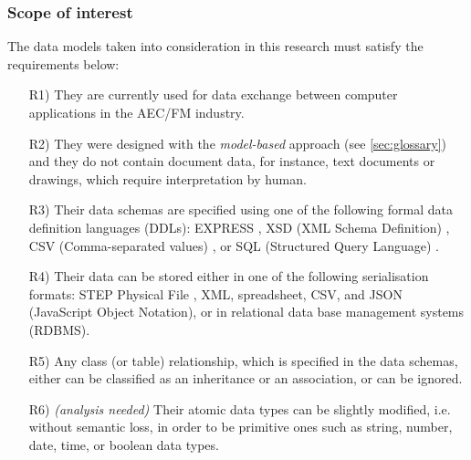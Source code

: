 \subsubsection{Scope of interest}\label{sec:scope-of-interest}

The data models taken into consideration in this research must satisfy the requirements below:

\begin{enumerate}

    \item[R1)]\label{req:R1} They are currently used for data exchange between computer applications in the AEC/FM industry.

    \item[R2)] They were designed with the \emph{model-based} approach (see \ref{sec:glossary}) and they do not contain document data, for instance, text documents or drawings, which require interpretation by human.
    
    \item[R3)] Their data schemas are specified using one of the following formal data definition languages (DDLs): EXPRESS \cite{iso2004express}, XSD (XML Schema Definition) \cite{gao2009xsd, peterson2009xsd}, CSV (Comma-separated values) \cite{retter2016csv}, or SQL (Structured Query Language) \cite{iso2016sql, gulutzan1999sql}.
    
    \item[R4)] Their data can be stored either in one of the following serialisation formats: STEP Physical File \cite{iso2016stepfile}, XML, spreadsheet, CSV, and JSON (JavaScript Object Notation), or in relational data base management systems (RDBMS).     

    \item[R5)] Any class (or table) relationship, which is specified in the data schemas, either can be classified as an inheritance or an association, or can be ignored.
    
    
    \item[R6)] \emph{(analysis needed)} Their atomic data types can be slightly modified, i.e. without semantic loss, in order to be primitive ones such as string, number, date, time, or boolean data types.
    
\end{enumerate}

